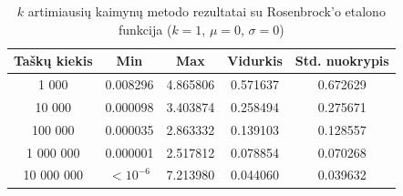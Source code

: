 \begin{table}[H]
    \centering
    \begin{tabular}{|c|c|c|c|c|}
        \hline
        \textbf{Taškų kiekis} & \textbf{Min} & \textbf{Max} & \textbf{Vidurkis} & \textbf{Std. nuokrypis} \\ \hline
        1 000        & 0.008296 & 4.865806 & 0.571637 & 0.672629 \\ \hline
        10 000       & 0.000098 & 3.403874 & 0.258494 & 0.275671 \\ \hline
        100 000      & 0.000035 & 2.863332 & 0.139103 & 0.128557 \\ \hline
        1 000 000    & 0.000001 & 2.517812 & 0.078854 & 0.070268 \\ \hline
        10 000 000   & $<10^{-6}$ & 7.213980 & 0.044060 & 0.039632 \\ \hline
    \end{tabular}
    \caption{$k$ artimiausių kaimynų metodo rezultatai su Rosenbrock'o etalono funkcija ($k = 1$, $\mu = 0$, $\sigma = 0$)}
\end{table}